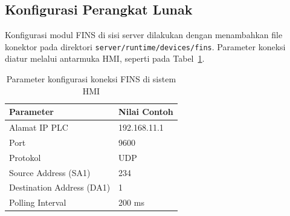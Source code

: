 
\subsection{Konfigurasi Perangkat Lunak}
Konfigurasi modul FINS di sisi server dilakukan dengan menambahkan file konektor pada direktori \texttt{server/runtime/devices/fins}. Parameter koneksi diatur melalui antarmuka HMI, seperti pada Tabel~\ref{tab:konfigurasi-fins}.

\begin{table}[H]
\centering
\begin{tabular}{|l|l|}
\hline
\textbf{Parameter} & \textbf{Nilai Contoh} \\ \hline
Alamat IP PLC & 192.168.11.1 \\ \hline
Port & 9600 \\ \hline
Protokol & UDP \\ \hline
Source Address (SA1) & 234 \\ \hline
Destination Address (DA1) & 1 \\ \hline
Polling Interval & 200 ms \\ \hline
\end{tabular}
\caption{Parameter konfigurasi koneksi FINS di sistem HMI}
\label{tab:konfigurasi-fins}
\end{table}

